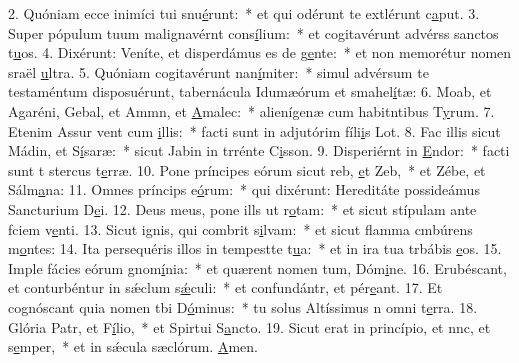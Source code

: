 2. Quóniam ecce inimíci tui snu\uline{é}runt:~* et qui odérunt te extlérunt c\uline{a}put.
3. Super pópulum tuum malignavérnt cons\uline{í}lium:~* et cogitavérunt advérss sanctos t\uline{u}os.
4. Dixérunt: Veníte, et disperdámus es de g\uline{e}nte:~* et non memorétur nomen sraël \uline{u}ltra.
5. Quóniam cogitavérunt nan\uline{í}miter:~* simul advérsum te testaméntum disposuérunt, tabernácula Idumæórum et smahel\uline{í}tæ:
6. Moab, et Agaréni, Gebal, et Ammn, et \uline{A}malec:~* alienígenæ cum habitntibus T\uline{y}rum.
7. Etenim Assur vent cum \uline{i}llis:~* facti sunt in adjutórim fíli\uline{i}s Lot.
8. Fac illis sicut Mádin, et S\uline{í}saræ:~* sicut Jabin in trrénte C\uline{i}sson.
9. Disperiérnt in \uline{E}ndor:~* facti sunt t stercus t\uline{e}rræ.
10. Pone príncipes eórum sicut reb, \uline{e}t Zeb,~* et Zébe, et Sálm\uline{a}na:
11. Omnes príncips e\uline{ó}rum:~* qui dixérunt: Hereditáte possideámus Sancturium D\uline{e}i.
12. Deus meus, pone ills ut r\uline{o}tam:~* et sicut stípulam ante fciem v\uline{e}nti.
13. Sicut ignis, qui combrit s\uline{i}lvam:~* et sicut flamma cmbúrens m\uline{o}ntes:
14. Ita persequéris illos in tempestte t\uline{u}a:~* et in ira tua trbábis \uline{e}os.
15. Imple fácies eórum gnom\uline{í}nia:~* et quærent nomen tum, Dóm\uline{i}ne.
16. Erubéscant, et conturbéntur in sǽclum s\uline{ǽ}culi:~* et confundántr, et pér\uline{e}ant.
17. Et cognóscant quia nomen tbi D\uline{ó}minus:~* tu solus Altíssimus n omni t\uline{e}rra.
18. Glória Patr, et F\uline{í}lio,~* et Spirtui S\uline{a}ncto.
19. Sicut erat in princípio, et nnc, et s\uline{e}mper,~* et in sǽcula sæclórum. \uline{A}men.
